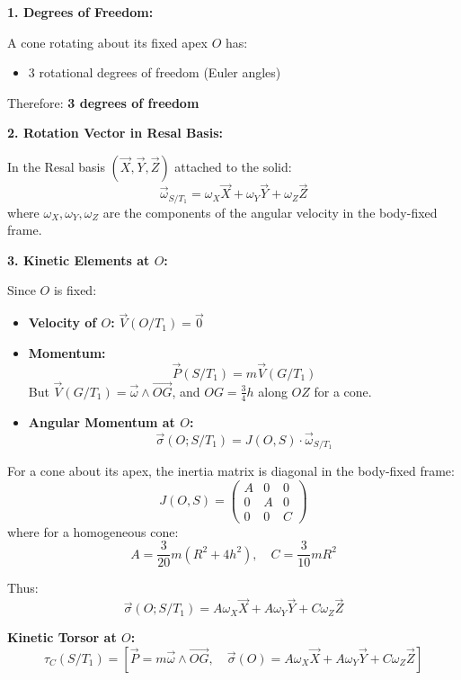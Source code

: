 \documentclass[12pt]{article}
\begin{document}
\begin{correctionbox}
\textbf{1. Degrees of Freedom:}

A cone rotating about its fixed apex $O$ has:
\begin{itemize}
    \item 3 rotational degrees of freedom (Euler angles)
\end{itemize}
Therefore: \textbf{3 degrees of freedom}

\textbf{2. Rotation Vector in Resal Basis:}

In the Resal basis $(\vec{X}, \vec{Y}, \vec{Z})$ attached to the solid:
\[
\vec{\omega}_{S/T_1} = \omega_X \vec{X} + \omega_Y \vec{Y} + \omega_Z \vec{Z}
\]
where $\omega_X, \omega_Y, \omega_Z$ are the components of the angular velocity in the body-fixed frame.

\textbf{3. Kinetic Elements at $O$:}

Since $O$ is fixed:
\begin{itemize}
    \item \textbf{Velocity of $O$:} $\vec{V}(O/T_1) = \vec{0}$
    \item \textbf{Momentum:}
    \[
    \vec{P}(S/T_1) = m \vec{V}(G/T_1)
    \]
    But $\vec{V}(G/T_1) = \vec{\omega} \wedge \vec{OG}$, and $OG = \frac{3}{4}h$ along $OZ$ for a cone.
    
    \item \textbf{Angular Momentum at $O$:}
    \[
    \vec{\sigma}(O; S/T_1) = J(O, S) \cdot \vec{\omega}_{S/T_1}
    \]
\end{itemize}

For a cone about its apex, the inertia matrix is diagonal in the body-fixed frame:
\[
J(O, S) = 
\begin{pmatrix}
A & 0 & 0 \\
0 & A & 0 \\
0 & 0 & C
\end{pmatrix}
\]
where for a homogeneous cone:
\[
A = \frac{3}{20} m (R^2 + 4h^2), \quad C = \frac{3}{10} m R^2
\]

Thus:
\[
\vec{\sigma}(O; S/T_1) = A \omega_X \vec{X} + A \omega_Y \vec{Y} + C \omega_Z \vec{Z}
\]

\textbf{Kinetic Torsor at $O$:}
\[
\tau_C(S/T_1) = \left[ \vec{P} = m \vec{\omega} \wedge \vec{OG},\quad \vec{\sigma}(O) = A \omega_X \vec{X} + A \omega_Y \vec{Y} + C \omega_Z \vec{Z} \right]
\]
\end{correctionbox}

\section{}
\end{document}
